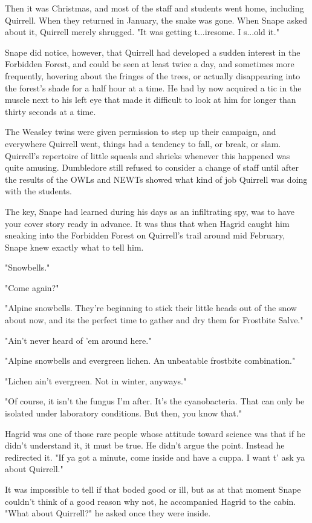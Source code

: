 Then it was Christmas, and most of the staff and students went home, including Quirrell. When they returned in January, the snake was gone. When Snape asked about it, Quirrell merely shrugged. "It was getting t...iresome. I s...old it."

Snape did notice, however, that Quirrell had developed a sudden interest in the Forbidden Forest, and could be seen at least twice a day, and sometimes more frequently, hovering about the fringes of the trees, or actually disappearing into the forest's shade for a half hour at a time. He had by now acquired a tic in the muscle next to his left eye that made it difficult to look at him for longer than thirty seconds at a time.

The Weasley twins were given permission to step up their campaign, and everywhere Quirrell went, things had a tendency to fall, or break, or slam. Quirrell's repertoire of little squeals and shrieks whenever this happened was quite amusing. Dumbledore still refused to consider a change of staff until after the results of the OWLs and NEWTs showed what kind of job Quirrell was doing with the students.

The key, Snape had learned during his days as an infiltrating spy, was to have your cover story ready in advance. It was thus that when Hagrid caught him sneaking into the Forbidden Forest on Quirrell's trail around mid February, Snape knew exactly what to tell him.

"Snowbells."

"Come again?"

"Alpine snowbells. They're beginning to stick their little heads out of the snow about now, and its the perfect time to gather and dry them for Frostbite Salve."

"Ain't never heard of 'em around here."

"Alpine snowbells and evergreen lichen. An unbeatable frostbite combination."

"Lichen ain't evergreen. Not in winter, anyways."

"Of course, it isn't the fungus I'm after. It's the cyanobacteria. That can only be isolated under laboratory conditions. But then, you know that."

Hagrid was one of those rare people whose attitude toward science was that if he didn't understand it, it must be true. He didn't argue the point. Instead he redirected it. "If ya got a minute, come inside and have a cuppa. I want t' ask ya about Quirrell."

It was impossible to tell if that boded good or ill, but as at that moment Snape couldn't think of a good reason why not, he accompanied Hagrid to the cabin. "What about Quirrell?" he asked once they were inside.

